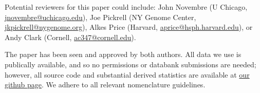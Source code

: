 \documentclass[stdletter,letterpaper,addrfromright,orderfromdateto,dateleft,11pt,noaddrto,sigleft]{newlfm}
\begin{document}
\begin{newlfm}
Potential reviewers for this paper could include:
John Novembre (U Chicago, \href{mailto:jnovembre@uchicago.edu}{jnovembre@uchicago.edu}),
Joe Pickrell (NY Genome Center, \href{mailto:jkpickrell@nygenome.org}{jkpickrell@nygenome.org}),
Alkes Price (Harvard, \href{mailto:aprice@hsph.harvard.edu}{aprice@hsph.harvard.edu}),
or Andy Clark (Cornell, \href{mailto:ac347@cornell.edu}{ac347@cornell.edu}).


The paper has been seen and approved by both authors.  
All data we use is publically available, and so no permissions or databank submissions are needed;
however, all source code and substantial derived statistics are available at 
\href{https://github.com/petrelharp/local_pca}{our github page}.
We adhere to all relevant nomenclature guidelines.




\end{newlfm}
\end{document}
